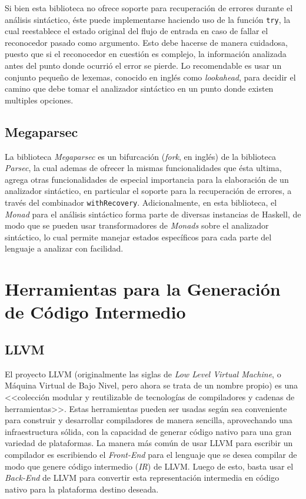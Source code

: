 Si bien esta biblioteca no ofrece soporte para recuperación de errores durante
el análisis sintáctico, éste puede implementarse haciendo uso de la función
\texttt{try}, la cual reestablece el estado original del flujo de entrada en
caso de fallar el reconocedor pasado como argumento. Esto debe hacerse de manera
cuidadosa, puesto que
 si
el reconocedor en cuestión es complejo, la información analizada antes del punto
donde ocurrió el error se pierde. Lo recomendable es usar un conjunto pequeño de
lexemas, conocido en inglés como \textit{lookahead}, para decidir el camino que
debe tomar el analizador sintáctico en un punto donde existen multiples
opciones.

\subsection{Megaparsec}

La biblioteca \textit{Megaparsec} es un bifurcación (\emph{fork}, en inglés) de
la biblioteca \textit{Parsec}, la cual ademas de ofrecer la mismas
funcionalidades que ésta ultima, agrega otras funcionalidades de especial
importancia para la elaboración de un analizador sintáctico, en particular el
soporte para la recuperación de errores, a través del combinador
\texttt{withRecovery}. Adicionalmente, en esta biblioteca, el \textit{Monad}
para el análisis sintáctico forma parte de diversas instancias de Haskell, de
modo que se pueden usar transformadores de \textit{Monads} sobre el analizador
sintáctico, lo cual permite manejar estados específicos para cada parte del
lenguaje a analizar con facilidad.


\section{Herramientas para la Generación de Código Intermedio}

\subsection{LLVM}

El proyecto LLVM (originalmente las siglas de \textit{Low Level Virtual
Machine}, o Máquina Virtual de Bajo Nivel, pero ahora se trata de un nombre
propio) es una <<colección modular y reutilizable de tecnologías de compiladores
y cadenas de herramientas>>. Estas herramientas pueden ser usadas según sea
conveniente para construir y desarrollar compiladores de manera sencilla,
aprovechando una infraestructura sólida, con la capacidad de generar código
nativo para una gran variedad de plataformas. La manera más común de usar LLVM
para escribir un compilador es escribiendo el \textit{Front-End} para el
lenguaje que se desea compilar de modo que genere código intermedio
(\textit{IR}) de LLVM. Luego de esto, basta usar el \textit{Back-End} de LLVM
para convertir esta representación intermedia en código nativo para la
plataforma destino deseada.

